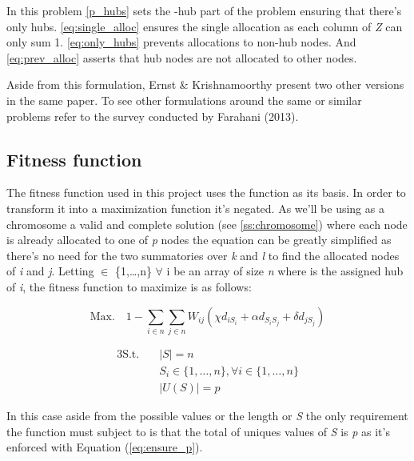 In this problem \eqref{p_hubs} sets the \ip-hub part of the problem
ensuring that there's only \ip hubs. \eqref{eq:single_alloc} ensures the single
allocation as each column of \emph{Z} can only sum 1. \eqref{eq:only_hubs} prevents
allocations to non-hub nodes. And \eqref{eq:prev_alloc} asserts that hub
nodes are not allocated to other nodes.

Aside from this formulation, Ernst \& Krishnamoorthy present two other versions in the
same paper\cite{Ernst1996}. To see other formulations around the same or similar problems
refer to the survey conducted by Farahani (2013)\cite{Farahani2013}.

\subsection{Fitness function}

The fitness function used in this project uses the  function as its basis.
In order to transform it into a maximization function it's negated. As we'll be using as a
chromosome a valid and complete solution (see \ref{ss:chromosome}) 
where each node is already allocated to one of \emph{p} nodes the equation can be greatly
simplified as there's no need for the two summatories over \emph{k} and \emph{l} to find the
allocated nodes of \emph{i} and \emph{j}. Letting  $\in$ \{1,\dots,n\} $\forall$ i be an
array of size \emph{n} where  is the assigned hub of \emph{i}, the fitness
function to maximize is as follows:


\[
  \text{Max.} \quad 1 - \sum_{i \in n} \sum_{j \in n} W_{ij} (\chi d_{iS_{i}} + \alpha d_{S_{i}S_{j}} + \delta d_{jS_{j}})
\]

\begin{alignat}{3}
  \text{S.t.} \quad & |S| = n \\
                    & S_{i} \in \{1,\dots,n\}, \forall i \in \{1,\dots,n\} \\
   & |U(S)| = p \label{eq:ensure_p}
\end{alignat}

In this case aside from the possible values or the length or \emph{S} the only requirement
the function must subject to is that the total of uniques values of \emph{S} is \emph{p}
as it's enforced with Equation (\ref{eq:ensure_p}).



